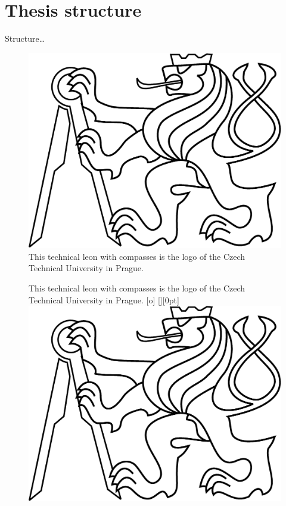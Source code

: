 \section{Thesis structure}
Structure\dots
\begin{figure}
  \centering
  \includegraphics[width=.6\LW]{images/lev}
  \caption{This technical leon with compasses is the logo
    of the Czech Technical University in Prague.}
  \label{fig:lev}
\end{figure}



\begin{figure}[bt]
  \begin{captionbeside}
    {This technical leon with compasses is the logo
    of the Czech Technical University in Prague.}
    [o] %
    [\linewidth][0pt]
    \includegraphics[width=.4\LW]{images/lev}
  \end{captionbeside}
  \label{fig:lev2}
\end{figure}



\endinput

